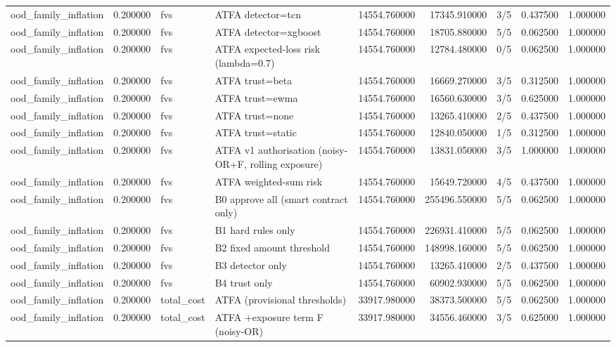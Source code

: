 \begin{tabular}{lrllrrlrr}
ood\_family\_inflation & 0.200000 & fvs & ATFA detector=tcn & 14554.760000 & 17345.910000 & 3/5 & 0.437500 & 1.000000 \\
ood\_family\_inflation & 0.200000 & fvs & ATFA detector=xgboost & 14554.760000 & 18705.880000 & 5/5 & 0.062500 & 1.000000 \\
ood\_family\_inflation & 0.200000 & fvs & ATFA expected-loss risk (lambda=0.7) & 14554.760000 & 12784.480000 & 0/5 & 0.062500 & 1.000000 \\
ood\_family\_inflation & 0.200000 & fvs & ATFA trust=beta & 14554.760000 & 16669.270000 & 3/5 & 0.312500 & 1.000000 \\
ood\_family\_inflation & 0.200000 & fvs & ATFA trust=ewma & 14554.760000 & 16560.630000 & 3/5 & 0.625000 & 1.000000 \\
ood\_family\_inflation & 0.200000 & fvs & ATFA trust=none & 14554.760000 & 13265.410000 & 2/5 & 0.437500 & 1.000000 \\
ood\_family\_inflation & 0.200000 & fvs & ATFA trust=static & 14554.760000 & 12840.050000 & 1/5 & 0.312500 & 1.000000 \\
ood\_family\_inflation & 0.200000 & fvs & ATFA v1 authorisation (noisy-OR+F, rolling exposure) & 14554.760000 & 13831.050000 & 3/5 & 1.000000 & 1.000000 \\
ood\_family\_inflation & 0.200000 & fvs & ATFA weighted-sum risk & 14554.760000 & 15649.720000 & 4/5 & 0.437500 & 1.000000 \\
ood\_family\_inflation & 0.200000 & fvs & B0 approve all (smart contract only) & 14554.760000 & 255496.550000 & 5/5 & 0.062500 & 1.000000 \\
ood\_family\_inflation & 0.200000 & fvs & B1 hard rules only & 14554.760000 & 226931.410000 & 5/5 & 0.062500 & 1.000000 \\
ood\_family\_inflation & 0.200000 & fvs & B2 fixed amount threshold & 14554.760000 & 148998.160000 & 5/5 & 0.062500 & 1.000000 \\
ood\_family\_inflation & 0.200000 & fvs & B3 detector only & 14554.760000 & 13265.410000 & 2/5 & 0.437500 & 1.000000 \\
ood\_family\_inflation & 0.200000 & fvs & B4 trust only & 14554.760000 & 60902.930000 & 5/5 & 0.062500 & 1.000000 \\
ood\_family\_inflation & 0.200000 & total\_cost & ATFA (provisional thresholds) & 33917.980000 & 38373.500000 & 5/5 & 0.062500 & 1.000000 \\
ood\_family\_inflation & 0.200000 & total\_cost & ATFA +exposure term F (noisy-OR) & 33917.980000 & 34556.460000 & 3/5 & 0.625000 & 1.000000 \\

\end{tabular}

